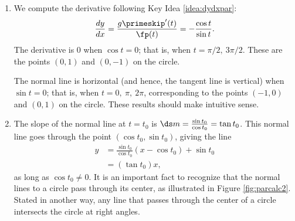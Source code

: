 		{\begin{enumerate}
			\item We compute the derivative following Key Idea \ref{idea:dydxpar}:
			$$\frac{dy}{dx} = \frac{g\primeskip'(t)}{\fp(t)} = -\frac{\cos t}{\sin t}.$$
			The derivative is $0$ when $\cos t= 0$; that is, when $t=\pi/2,\ 3\pi/2$. These are the points $(0,1)$ and $(0,-1)$ on the circle.
			
			The normal line is horizontal (and hence, the tangent line is vertical) when $\sin t=0$; that is, when $t= 0,\ \pi,\ 2\pi$, corresponding to the points $(-1,0)$ and $(0,1)$ on the circle. These results should make intuitive sense.
			\item		The slope of the normal line at $t=t_0$ is $\ds m=\frac{\sin t_0}{\cos t_0} = \tan t_0$. This normal line goes through the point $(\cos t_0,\sin t_0)$, giving the line \begin{align*}y &=\frac{\sin t_0}{\cos t_0}(x-\cos t_0) + \sin t_0\\	
							&= (\tan t_0)x,
\end{align*}
as long as $\cos t_0\neq 0$. It is an important fact to recognize that the normal lines to a circle pass through its center, as illustrated in Figure \ref{fig:parcalc2}. Stated in another way, any line that passes through the center of a circle intersects the circle at right angles.
		\end{enumerate}}

\clearpage

